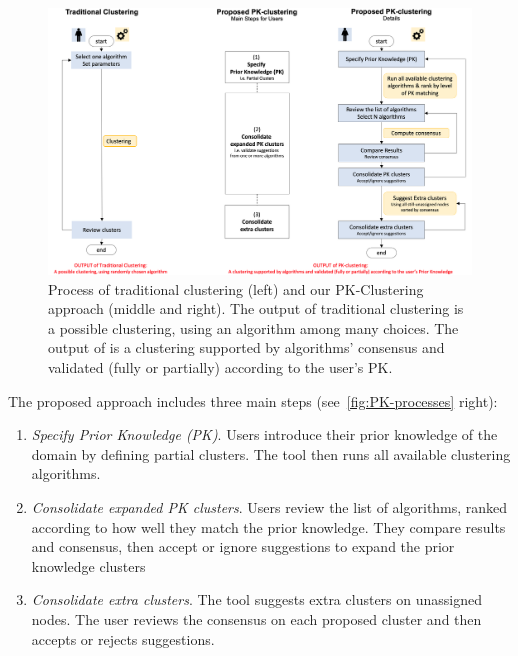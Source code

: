 \begin{figure}[!ht]
    \centering
    \includegraphics[width=\textwidth]{static/figures/PK-Clustering/VISPaperFigures/pkprocess}
    \caption{Process of traditional clustering (left) and our PK-Clustering approach (middle and right). The output of traditional clustering is a possible clustering, using an algorithm among many choices. The output of \pkclustering is a clustering supported by algorithms' consensus and validated (fully or partially) according to the user's PK.}
\label{fig:PK-processes}
\end{figure}
The proposed approach includes three main steps (see~\autoref{fig:PK-processes} right):
\begin{enumerate}[nosep]
\item \textit{Specify Prior Knowledge (PK)}. Users introduce their prior knowledge of the domain by defining partial clusters. The tool then runs all available clustering algorithms.
\item \textit{Consolidate expanded PK clusters}. Users review the list of algorithms, ranked according to how well they match the prior knowledge.  They compare results and consensus, then accept or ignore suggestions to expand the prior knowledge clusters
\item \textit{Consolidate extra clusters}. The tool suggests extra clusters on unassigned nodes. The user reviews the consensus on each proposed cluster and then accepts or rejects suggestions.
\end{enumerate}

